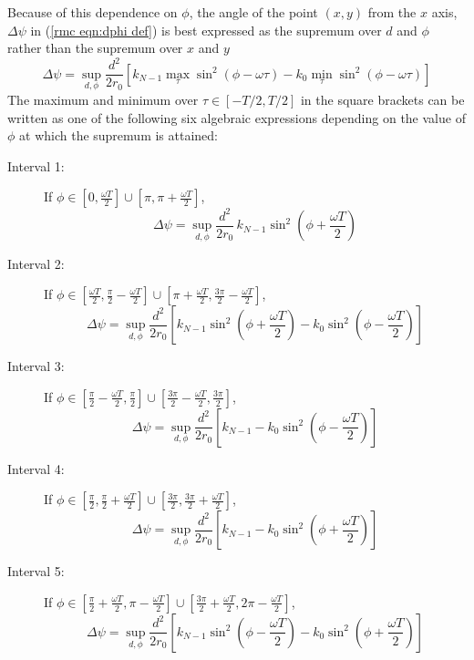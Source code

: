 Because of this dependence on $\phi$, the angle of the point $(x,y)$ from
the $x$ axis, $\Delta\psi$ in (\ref{rmc eqn:dphi def}) is best expressed as
the supremum over $d$ and $\phi$ rather than the supremum over $x$ and $y$
\begin{equation}
\Delta\psi=\sup_{d,\phi}\frac{d^2}{2r_0}\left[
k_{N-1}\max_{\tau}\sin^2(\phi-\omega\tau)
-k_0\min_{\tau}\sin^2(\phi-\omega\tau)
\right]
\end{equation}
The maximum and minimum over $\tau\in[-T/2,T/2]$ in the square brackets 
can be written as one of the following six algebraic expressions depending 
on the value of $\phi$ at which the supremum is attained:
\begin{description}
\item[Interval 1:]
If $\phi\in[0,\frac{\omega T}{2}]\cup[\pi,\pi+\frac{\omega T}{2}]$,
\begin{equation}
\Delta\psi=\sup_{d,\phi}\frac{d^2}{2r_0}
\,k_{N-1}\sin^2\left(\phi+\frac{\omega T}{2}\right)
\end{equation}

\item[Interval 2:]
If $\phi\in[\frac{\omega T}{2},\frac{\pi}{2}-\frac{\omega T}{2}]
\cup[\pi+\frac{\omega T}{2},\frac{3\pi}{2}-\frac{\omega T}{2}]$,
\begin{equation}
\Delta\psi=\sup_{d,\phi}\frac{d^2}{2r_0}\left[
k_{N-1}\sin^2\left(\phi+\frac{\omega T}{2}\right)
-k_0\sin^2\left(\phi-\frac{\omega T}{2}\right)
\right]
\end{equation}

\item[Interval 3:]
If $\phi\in[\frac{\pi}{2}-\frac{\omega T}{2},\frac{\pi}{2}]
\cup[\frac{3\pi}{2}-\frac{\omega T}{2},\frac{3\pi}{2}]$,
\begin{equation}
\Delta\psi=\sup_{d,\phi}\frac{d^2}{2r_0}\left[
k_{N-1}-k_0\sin^2\left(\phi-\frac{\omega T}{2}\right)
\right]
\end{equation}

\item[Interval 4:]
If $\phi\in[\frac{\pi}{2},\frac{\pi}{2}+\frac{\omega T}{2}]
\cup[\frac{3\pi}{2},\frac{3\pi}{2}+\frac{\omega T}{2}]$,
\begin{equation}
\Delta\psi=\sup_{d,\phi}\frac{d^2}{2r_0}\left[
k_{N-1}-k_0\sin^2\left(\phi+\frac{\omega T}{2}\right)
\right]
\end{equation}

\item[Interval 5:]
If $\phi\in[\frac{\pi}{2}+\frac{\omega T}{2},\pi-\frac{\omega T}{2}]
\cup[\frac{3\pi}{2}+\frac{\omega T}{2},2\pi-\frac{\omega T}{2}]$,
\begin{equation}
\Delta\psi=\sup_{d,\phi}\frac{d^2}{2r_0}\left[
k_{N-1}\sin^2\left(\phi-\frac{\omega T}{2}\right)
-k_0\sin^2\left(\phi+\frac{\omega T}{2}\right)
\right]
\end{equation}


\end{description}
